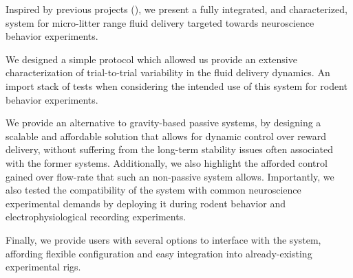 Inspired by previous projects (\citep{Amarante2019, Wijnen2014}), we present a fully integrated, and characterized, system for micro-litter range fluid delivery targeted towards neuroscience behavior experiments. 
 
We designed a simple protocol which allowed us provide an extensive characterization of trial-to-trial variability in the fluid delivery dynamics. An import stack of tests when considering the intended use of this system for rodent behavior experiments.

We provide an alternative to gravity-based passive systems, by designing a scalable and affordable solution that allows for dynamic control over reward delivery, without suffering from the long-term stability issues often associated with the former systems. Additionally, we also highlight the afforded control gained over flow-rate that such an non-passive system allows.
Importantly, we also tested the compatibility of the system with common neuroscience experimental demands by deploying it during rodent behavior and electrophysiological recording experiments.

Finally, we provide users with several options to interface with the system, affording flexible configuration and easy integration into already-existing experimental rigs. 